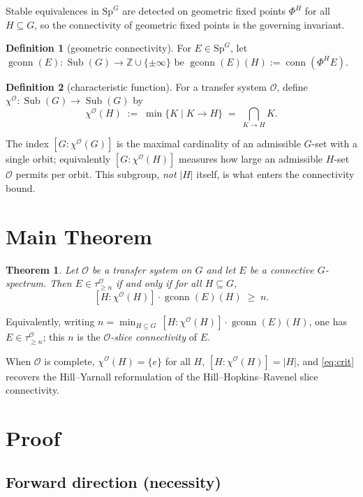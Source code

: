 \documentclass[11pt]{article}
\newcommand{\aO}{\mathcal{O}}
\newcommand{\Sp}{\mathrm{Sp}}
\newcommand{\Z}{\mathbb{Z}}
\newcommand{\gconn}{\operatorname{gconn}}
\newcommand{\conn}{\operatorname{conn}}
\newcommand{\Sub}{\operatorname{Sub}}
\newtheorem{theorem}{Theorem}
\theoremstyle{definition}
\newtheorem{definition}{Definition}
\begin{document}
Stable equivalences in $\Sp^G$ are detected on geometric fixed points
$\Phi^H$ for all $H\subseteq G$, so the connectivity of geometric fixed points
is the governing invariant.

\begin{definition}[geometric connectivity]
For $E\in\Sp^G$, let $\gconn(E):\Sub(G)\to\Z\cup\{\pm\infty\}$ be
$\gconn(E)(H):=\conn(\Phi^H E)$.
\end{definition}

\begin{definition}[characteristic function]
For a transfer system $\aO$, define $\chi^\aO:\Sub(G)\to\Sub(G)$ by
\[
\chi^\aO(H)\;:=\;\min\{K\mid K\to H\}\;=\;\bigcap_{K\to H}K .
\]
\end{definition}

The index $[G:\chi^\aO(G)]$ is the maximal cardinality of an admissible $G$-set
with a single orbit; equivalently $[G:\chi^\aO(H)]$ measures how large an
admissible $H$-set $\aO$ permits per orbit. This subgroup, \emph{not} $|H|$
itself, is what enters the connectivity bound.

\section*{Main Theorem}

\begin{theorem}\label{thm:main}
Let $\aO$ be a transfer system on $G$ and let $E$ be a connective $G$-spectrum.
Then $E\in\tau^\aO_{\ge n}$ if and only if for all $H\subseteq G$,
\begin{equation}\label{eq:crit}
[H:\chi^\aO(H)]\cdot\gconn(E)(H)\;\ge\;n .
\end{equation}
\end{theorem}

Equivalently, writing
$n=\min_{H\subseteq G}\,[H:\chi^\aO(H)]\cdot\gconn(E)(H)$, one has
$E\in\tau^\aO_{\ge n}$; this $n$ is the \emph{$\aO$-slice connectivity} of $E$.

When $\aO$ is complete, $\chi^\aO(H)=\{e\}$ for all $H$, $[H:\chi^\aO(H)]=|H|$,
and \eqref{eq:crit} recovers the Hill--Yarnall reformulation \cite{HY18} of the
Hill--Hopkins--Ravenel slice connectivity.

\section*{Proof}

\subsection*{Forward direction (necessity)}
\end{document}
